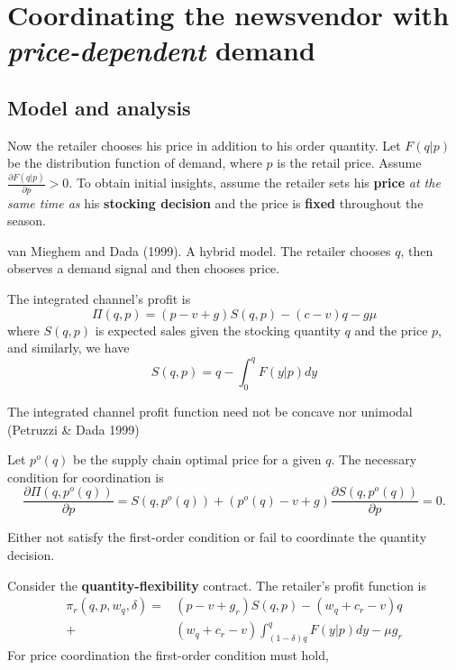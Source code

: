 \newcommand{\spq}{S(q,p^o(q))}
\newcommand{\pq}{p^o(q)}
\thispagestyle{empty}
\section{Coordinating the newsvendor with \textit{price-dependent} demand}


\subsection{Model and analysis}
Now the retailer chooses his price in addition to his order quantity. Let $F(q|p)$ be the distribution function of demand, where $p$ is the retail price. Assume $\frac{\partial F(q|p)}{\partial p}>0$. To obtain initial insights, assume the retailer sets his \textbf{price} \textit{at the same time as} his \textbf{stocking decision} and the price is \textbf{fixed} throughout the season.
\begin{note}
    van Mieghem and Dada (1999). A hybrid model. The retailer chooses $q$, then observes a demand signal and then chooses price.
\end{note}

The integrated channel's profit is 
\begin{equation*}
    \Pi(q,p)=(p-v+g)S(q,p)-(c-v)q-g\mu
\end{equation*}
where $S(q,p)$ is expected sales given the stocking quantity $q$ and the price $p$, and similarly, we have
\begin{equation*}
    S(q,p)=q-\int_0^q F(y|p)dy
\end{equation*}
\begin{note}
    The integrated channel profit function need not be concave nor unimodal (Petruzzi \& Dada 1999)
\end{note}
Let $\pq$ be the supply chain optimal price for a given $q$. The necessary condition for coordination is
\begin{equation}\label{eq:3.1}
    \frac{\partial\Pi(q,p^o(q))}{\partial p}=S(q,p^o(q))+(p^o(q)-v+g)\frac{\partial S(q,p^o(q))}{\partial p}=0.
\end{equation}
\begin{note}
    Either not satisfy the first-order condition or fail to coordinate the quantity decision.
\end{note}

Consider the \textbf{quantity-flexibility} contract. The retailer's profit function is 
\begin{align*}
    \pi_r(q,p,w_q,\delta)=&(p-v+g_r)S(q,p)-(w_q+c_r-v)q\\
    +&(w_q+c_r-v)\int_{(1-\delta)q}^q F(y|p)dy-\mu g_r
\end{align*}
For price coordination the first-order condition must hold,

